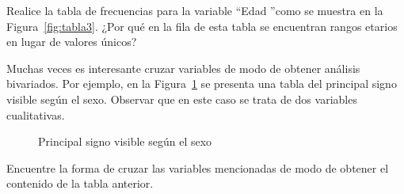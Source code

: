 \documentclass{prob}
\begin{document}
\begin{problema}
	\begin{parte}
		Realice la tabla de frecuencias para la variable \textquotedblleft Edad \textquotedblright como se muestra en la Figura~\ref{fig:tabla3}. ¿Por qué en la fila de esta tabla se encuentran rangos etarios en lugar de valores únicos? \\		
		
		\noindent{}	

	\end{parte}
		
    \end{problema}
        
    \begin{problema}
    Muchas veces es interesante cruzar variables de modo de obtener análisis bivariados. Por ejemplo, en la Figura~\ref{fig:ej3} se presenta una tabla del principal signo visible según el sexo. Observar que en este caso se trata de dos variables cualitativas.\\
\begin{figure}[!ht]
    \centering
    
    \caption{Principal signo visible según el sexo}
    \label{fig:ej3}
\end{figure}

	Encuentre la forma de cruzar las variables mencionadas de modo de obtener el contenido de la tabla anterior.\\
	
\noindent{}	
	
	\end{problema}
\end{document}
